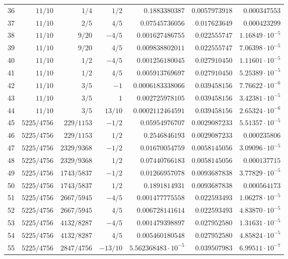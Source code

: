 \documentclass[11pt,reqno]{amsart}
\numberwithin{equation}{section}
\theoremstyle{definition}
\theoremstyle{remark}
\begin{document}
\begin{center}
\begin{longtable}{@{}rrrrrrr@{}}
36 & $11/10$ & $1/4$ & $1/2$ & $0.1883380387$ & $0.0057973918$ & $0.000347553$\\
37 & $11/10$ & $2/5$ & $4/5$ & $0.07545736056$ & $0.017623649$ & $0.000423299$\\
38 & $11/10$ & $9/20$ & $-4/5$ & $0.001627486755$ & $0.022555747$ & $1.16849\cdot10^{-5}$\\
39 & $11/10$ & $9/20$ & $4/5$ & $0.009838802011$ & $0.022555747$ & $7.06398\cdot10^{-5}$\\
40 & $11/10$ & $1/2$ & $-4/5$ & $0.001256180045$ & $0.027910450$ & $1.11601\cdot10^{-5}$\\
41 & $11/10$ & $1/2$ & $4/5$ & $0.005913769697$ & $0.027910450$ & $5.25389\cdot10^{-5}$\\
42 & $11/10$ & $3/5$ & $-1$ & $0.0006183338066$ & $0.039458156$ & $7.76622\cdot10^{-6}$\\
43 & $11/10$ & $3/5$ & $1$ & $0.002725978105$ & $0.039458156$ & $3.42381\cdot10^{-5}$\\
44 & $11/10$ & $3/5$ & $13/10$ & $0.0002112464591$ & $0.039458156$ & $2.65324\cdot10^{-6}$\\
45 & $5225/4756$ & $229/1153$ & $-1/2$ & $0.05954976707$ & $0.0029087233$ & $5.51357\cdot10^{-5}$\\
46 & $5225/4756$ & $229/1153$ & $1/2$ & $0.2546846193$ & $0.0029087233$ & $0.000235806$\\
47 & $5225/4756$ & $2329/9368$ & $-1/2$ & $0.01670054759$ & $0.0058145056$ & $3.09096\cdot10^{-5}$\\
48 & $5225/4756$ & $2329/9368$ & $1/2$ & $0.07440766183$ & $0.0058145056$ & $0.000137715$\\
49 & $5225/4756$ & $1743/5837$ & $-1/2$ & $0.01266957078$ & $0.0093687838$ & $3.77829\cdot10^{-5}$\\
50 & $5225/4756$ & $1743/5837$ & $1/2$ & $0.1891814931$ & $0.0093687838$ & $0.000564173$\\
51 & $5225/4756$ & $2667/5945$ & $-4/5$ & $0.001477775558$ & $0.022593493$ & $1.06278\cdot10^{-5}$\\
52 & $5225/4756$ & $2667/5945$ & $4/5$ & $0.006728141614$ & $0.022593493$ & $4.83870\cdot10^{-5}$\\
53 & $5225/4756$ & $4132/8287$ & $-4/5$ & $0.001479398897$ & $0.027952580$ & $1.31631\cdot10^{-5}$\\
54 & $5225/4756$ & $4132/8287$ & $4/5$ & $0.005460180548$ & $0.027952580$ & $4.85824\cdot10^{-5}$\\
55 & $5225/4756$ & $2847/4756$ & $-13/10$ & $5.562368483\cdot10^{-5}$ & $0.039507983$ & $6.99511\cdot10^{-7}$\\

\end{longtable}
\end{center}
\end{document}
